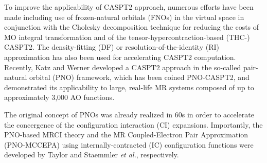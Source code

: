 \documentclass[aip,jcp,amsmath]{revtex4-1}
\begin{document}
%
To improve the applicability of CASPT2 approach, numerous efforts have been made including use of frozen-natural orbitals (FNOs)\cite{doi:10.1063/1.3157463,doi:10.1021/acs.jctc.5b00479} in the virtual space in conjunction with the Cholesky decomposition technique for reducing the costs of MO integral transformation\cite{doi:10.1063/1.2953696,doi:10.1021/ct9000284,doi:10.1021/ct700263h,doi:10.1021/ct900612k} and of the tensor-hypercontraction-based (THC-) CASPT2.\cite{doi:10.1063/1.5037283}
%
The density-fitting (DF) or resolution-of-the-identity (RI) approximation has also been used for accelerating CASPT2 computation.\cite{ShioWerner2013}
%
Recently, Katz and Werner developed a CASPT2 approach in the so-called pair-natural orbital (PNO) framework, which has been coined PNO-CASPT2, and demonstrated its applicability to large, real-life MR systems composed of up to approximately 3,000 AO functions.\cite{:/content/aip/journal/jcp/145/12/10.1063/1.4963019,doi:10.1063/1.5097644}

%
The original concept of PNOs was already realized in 60s in order to accelerate the concergence of the configuration interaction (CI) expansions.\cite{:/content/aip/journal/jcp/40/12/10.1063/1.1725065,:/content/aip/journal/jcp/48/4/10.1063/1.1668917,:/content/aip/journal/jcp/42/3/10.1063/1.1696050,:/content/aip/journal/jcp/45/5/10.1063/1.1727841,meyer1971ionization,:/content/aip/journal/jcp/58/3/10.1063/1.1679283,meyer1971ionization,Ahlrichs1968_2}
%
Importantly, the PNO-based MRCI theory and the MR Coupled-Electron Pair Approximation (PNO-MCCEPA) using internally-contracted (IC) configuration functions were developed by Taylor\cite{:/content/aip/journal/jcp/74/2/10.1063/1.441186} and Staemmler {\it et al.},\cite{Staemmler1993} respectively.
\end{document}
